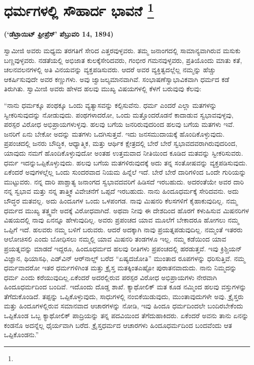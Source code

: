 
\chapter[ಧರ್ಮಗಳಲ್ಲಿ ಸೌಹಾರ್ದ ಭಾವನೆ ]{ಧರ್ಮಗಳಲ್ಲಿ ಸೌಹಾರ್ದ ಭಾವನೆ \protect\footnote{}}

\centerline{\textbf{(‘ಡೆಟ್ರಾಯಿಟ್​ ಫ್ರೀಪ್ರೆಸ್​’ ಪೆಬ್ರುವರಿ 14, 1894)}}

\vskip 5pt

ಸ್ವಾಮೀಜಿ ಅವರು ಮಧ್ಯಮ ತರಗತಿಗೆ ಸೇರಿದ ಎತ್ತರವುಳ್ಳವರು. ತಮ್ಮ ಜನಾಂಗದಲ್ಲಿ ಸಾಮಾನ್ಯವಾಗಿರುವ ಮಸುಕು ಬಣ್ಣವುಳ್ಳವರು. ನಡತೆಯಲ್ಲಿ ಅಭಿಜಾತ ಕುಲಕ್ಕೆ\break ಸೇರಿದವರು, ಗಂಭೀರ ಗಮನವುಳ್ಳವರು, ಪ್ರತಿಯೊಂದು ಮಾತು ಕತೆ, ಚಲನವಲನಗಳಲ್ಲಿ ಅತಿ ವಿನಯವನ್ನು ವ್ಯಕ್ತಪಡಿಸುವರು. ಆದರೆ ಅವರ ವ್ಯಕ್ತಿತ್ವದಲ್ಲೆಲ್ಲ ನಮ್ಮನ್ನು ಹೆಚ್ಚು ಆಕರ್ಷಿಸುವುದೇ ಅವರ ಕಣ್ಣುಗಳು. ಅವು ಜ್ವಾಜಲ್ಯಮಾನವಾಗಿವೆ. ಸಂಭಾಷಣೆ\break ಸ್ವಾಭಾವಿಕವಾಗಿ ಧರ್ಮದ ಕಡೆ ತಿರುಗಿತು. ಸ್ವಾಮೀಜಿ ಅವರು ಹೇಳದ ಹಲವು ಮುಖ್ಯ ವಿಷಯಗಳಲ್ಲಿ ಕೆಳಗೆ ಬರುವುವು ಕೆಲವು:

\vskip 5pt

“ನಾನು ಧರ್ಮಕ್ಕೂ ಪಂಥಕ್ಕೂ ಒಂದು ವ್ಯತ್ಯಾಸವನ್ನು ಕಲ್ಪಿಸುವೆನು. ಧರ್ಮ ಎಂದರೆ ಎಲ್ಲಾ ಮತಗಳನ್ನು ಸ್ವೀಕರಿಸುವುದನ್ನು ನೋಡುವುದು. ಪಂಥಗಳಾದರೋ, ಒಂದು ಮತ್ತೊಂದರೊಡನೆ ಕಾದಾಡುವ ಸ್ವಭಾವವುಳ್ಳವು, ಪರಸ್ಪರ ವಿರೋಧ ಅಭಿಪ್ರಾಯಗಳುಳ್ಳವು. ಹಲವು ಬಗೆಯ ಜನರಿರುವುದರಿಂದ ಹಲವು ಬಗೆಯ ಮತಗಳು ಇವೆ. ಜನರಿಗೆ ಏನು ಬೇಕೋ ಅದನ್ನು ಮತಗಳು ಒದಗಿಸುತ್ತವೆ. ಇದು ಜನಸಮುದಾಯಕ್ಕೆ ಹೊಂದಿಕೊಳ್ಳುವುದು. ಪ್ರಪಂಚದಲ್ಲಿ ಜನರು ಬೌದ್ಧಿಕ, ಆಧ್ಯಾತ್ಮಿಕ, ಮತ್ತು ಆರ್ಥಿಕ ಕ್ಷೇತ್ರದಲ್ಲಿ ಬೇರೆ ಬೇರೆ ಸ್ವಭಾವದವರಾಗಿರುವುದರಿಂದ, ಯಾವುದು ನಮಗೆ ಹೊಂದಿಕೊಳ್ಳುವುದೋ ಅಂತಹ ಉತ್ತಮವಾದ ನೀತಿಯಿಂದ ಕೂಡಿದ ಮತವನ್ನು ಸ್ವೀಕರಿಸುವರು. ಧರ್ಮ ಇದನ್ನು\break ಒಪ್ಪಿಕೊಳ್ಳುವುದು. ಹಲವು ಬಗೆಯ ಮತಗಳಿರುವುದಕ್ಕೆ ಅದು ತನ್ನ ಸಂತೋಷವನ್ನು ವ್ಯಕ್ತಪಡಿಸುವುದು. ಏಕೆಂದರೆ ಅವುಗಳಲ್ಲೆಲ್ಲ ಒಂದು ಸುಂದರವಾದ ನಿಯಮ ಹಿನ್ನೆಲೆ ಇದೆ. ಬೇರೆ ಬೇರೆ ದಾರಿಗಳಿಂದ ಒಂದೇ ಗುರಿಯನ್ನು ಮುಟ್ಟುವರು. ನನ್ನ ದಾರಿ ಪಾಶ್ಚಾತ್ಯ ಜನಾಂಗದ ಸ್ವಭಾವದವರಿಗೆ ಹಿಡಿಸದೆ ಇರಬಹುದು. ಅದರಂತೆಯೇ ಅವರ ದಾರಿ ನನ್ನ ಸ್ವಭಾವ ಮತ್ತು ನನ್ನ ತಾತ್ತ್ವಿಕ ವಿವೇಚನೆಗೆ ಒಪ್ಪದೆ ಇರಬಹುದು. ನಾನು ಹಿಂದೂಧರ್ಮಕ್ಕೆ ಸೇರಿದವನು. ಅದು ಬೌದ್ಧರ ಮತವಲ್ಲ. ಅದು ಹಿಂದೂಗಳ ಒಂದು ಒಳಪಂಗಡ. ನಾವು ಮಿಷನರಿ ಕೆಲಸಗಳಿಗೆ ಕೈಹಾಕುವುದಿಲ್ಲ. ನಮ್ಮ ಧರ್ಮದ ಮುಖ್ಯ ತತ್ತ್ವವೇ ಅದಕ್ಕೆ ವಿರೋಧವಾಗಿದೆ. ಅಥವಾ ನೀವು ಈ ದೇಶದಿಂದ ಹೊರಗೆ ಕಳುಹಿಸುವ ಮಿಷನರಿಗಳ ವಿಷಯದಲ್ಲಿ ನಾವು ಏನನ್ನೂ ಹೇಳುವುದಿಲ್ಲ. ಅವರು ಪ್ರಪಂಚದ ಯಾವ ಮೂಲೆಗೆ ಬೇಕಾದರೂ ಹೋಗಲು ನಮ್ಮ ಒಪ್ಪಿಗೆ ಇದೆ. ಹಲವರು ನಮ್ಮ ಬಳಿಗೆ ಬರುವರು. ಆದರೆ ಅದಕ್ಕಾಗಿ ನಾವು ಪ್ರಯತ್ನಪಡುವುದಿಲ್ಲ. ನಮ್ಮಂತೆ ಇತರರು ಆಲೋಚಿಸಲಿ ಎಂದು ಬೋಧಿಸಲು ನಮ್ಮಲ್ಲಿ ಯಾವ ಮಿಷನರಿ ತಂಡಗಳೂ ಇಲ್ಲ. ನಮ್ಮ ಕಡೆಯಿಂದ ಯಾವ ಪ್ರಯತ್ನವನ್ನು ಮಾಡದೆ ಇದ್ದರೂ, ಹಿಂದೂಧರ್ಮದ ಹಲವು ರೀತಿಗಳು ಪ್ರಪಂಚದಲ್ಲಿ ಹರಡುತ್ತವೆ. ಇವು ಕ್ರಿಶ್ಚಿಯನ್​ ವಿಜ್ಞಾನ, ಥಿಯಾಸಫಿ, ಎಡ್​ವಿನ್​ ಆರ್​ನಾಲ್ಡ್​ ಬರೆದ “ಏಷ್ಯದಜೋತಿ” ಮುಂತಾದ ರೂಪಗಳನ್ನು ಧರಿಸುತ್ತಿವೆ. ನಮ್ಮ ಧರ್ಮವಾದರೋ ಇತರ ಧರ್ಮಗಳಿಗಿಂತ ಮತ್ತು ಕ್ರೈಸ್ತ ಮತಕ್ಕಿಂತ\break ಎಷ್ಟೋ ಪುರಾತನವಾದುದು. ನಾನು ನಿಮ್ಮದನ್ನು ಧರ್ಮ ಎಂದು ಕರೆಯುವುದಿಲ್ಲ.\break ಏಕೆಂದರೆ ಅದರಲ್ಲಿರುವ ಪರಸ್ಪರ ವಿರೋಧ ಅಭಿಪ್ರಾಯಗಳು ನೇರವಾಗಿ ಹಿಂದೂಧರ್ಮದಿಂದ ಬಂದಿವೆ. ಇದೊಂದು ದೊಡ್ಡ ಶಾಖೆ. ಕ್ಯಾಥೋಲಿಕ್​ ಮತ ಕೂಡ ನಮ್ಮಿಂದ ಹಲವು ವಸ್ತುಗಳನ್ನು ತೆಗೆದುಕೊಂಡಿದೆ. ತಪ್ಪನ್ನು ಒಪ್ಪಿಕೊಳ್ಳುವುದು, ಸಾಧುಗಳಲ್ಲಿ ನಂಬಿಕೆಯಿಡುವುದು, ಮುಂತಾವುದುಗಳೇ ಅವು. ಕ್ರೈಸ್ತರು ಮತ್ತು ಹಿಂದೂಗಳಲ್ಲಿರುವ ಸಮಾನವಾದ ಆಚಾರಗಳನ್ನು ನೋಡಿ, ಇವು ಹಿಂದೂ ಧರ್ಮದಿಂದಲೇ ಬಂದಿರಬೇಕೆಂದು ಒಪ್ಪಿಕೊಂಡ ಒಬ್ಬ ಕ್ಯಾಥೋಲಿಕ್​ ಪಾದ್ರಿಯನ್ನು ತನ್ನ ಪದವಿಯಿಂದ ತೆಗೆದುಹಾಕಿದರು. ಏಕೆಂದರೆ ಅವನು ತಾನು ಏನನ್ನು ಕಂಡನೊ ಅದನ್ನೆಲ್ಲ ಧೈರ್ಯವಾಗಿ ಬರೆದ. ಕ್ರೈಸ್ತಧರ್ಮದ ಆಚಾರಗಳು ಹಿಂದೂಧರ್ಮದಿಂದ ಬಂದವೆಂದು ಆತ ಒಪ್ಪಿಕೊಂಡನು.”

